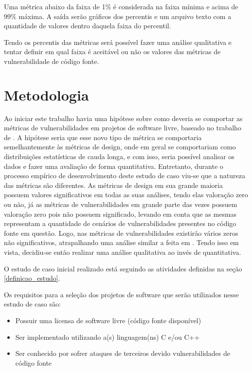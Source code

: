 Uma métrica abaixo da faixa de 1\% é considerada na faixa mínima e acima de 99\% máxima. A saída serão gráficos dos percentis
e um arquivo texto com a quantidade de valores dentro daquela faixa do percentil.

Tendo os percentis das métricas será possível fazer uma análise qualitativa e tentar definir em qual faixa é aceitável ou não
os valores das métricas de vulnerabilidade de código fonte.

\section{Metodologia} \label{metod_estudo}

Ao iniciar este trabalho havia uma hipótese sobre como deveria se comportar as métricas de vulnerabilidades em projetos de
software livre, baseado no trabalho de \cite{meirelles2013}. A hipótese seria que esse novo tipo de métrica se comportaria
semelhantemente às métricas de design, onde em geral se comportariam como distribuições estatísticas de cauda longa, e com
isso, seria possível analisar os dados e fazer uma avaliação de forma quantitativa. Entretanto, durante o processo empírico
de desenvolvimento deste estudo de caso viu-se que a natureza das métricas são diferentes. As métricas de design em sua grande
maioria possuem valores significativos em todas as suas análises, tendo elas valoração zero ou não, já as métricas de 
vulnerabilidades em grande parte das vezes possuem valoração zero pois não possuem significado, levando em conta que as mesmas
representam a quantidade de cenários de vulnerabilidades presentes no código fonte em questão. Logo, nas métricas de 
vulnerabilidades existirão vários zeros não significativos, atrapalhando uma análise similar a feita em \cite{meirelles2013}.
Tendo isso em vista, decidiu-se então realizar uma análise qualitativa ao invés de quantitativa.

O estudo de caso inicial realizado está seguindo as atividades definidas na seção \ref{definicao_estudo}.

Os requisitos para a seleção dos projetos de software que serão utilizados nesse estudo de caso são:

\begin{itemize}
  \item Possuir uma licensa de software livre (código fonte disponível)
  \item Ser implementado utilizando a(s) linguagem(ns) C e/ou C++
  \item Ser conhecido por sofrer ataques de terceiros devido vulnerabilidades de código fonte
\end{itemize}

